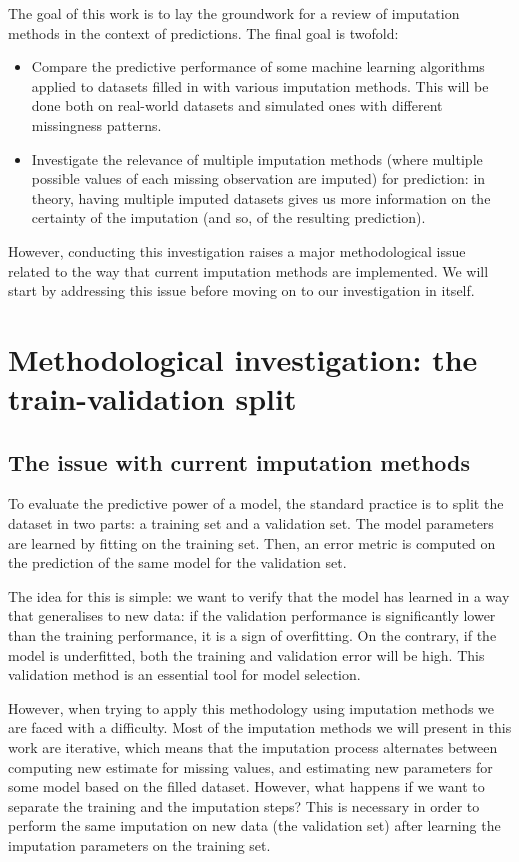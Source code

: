 \documentclass[12pt, a4paper]{article}
\begin{document}
The goal of this work is to lay the groundwork for a review of imputation methods in the context of predictions. The final goal is twofold:
\begin{itemize}
\item Compare the predictive performance of some machine learning algorithms applied to datasets filled in with various imputation methods. This will be done both on real-world datasets and simulated ones with different missingness patterns.
\item Investigate the relevance of multiple imputation methods (where multiple possible values of each missing observation are imputed) for prediction: in theory, having multiple imputed datasets gives us more information on the certainty of the imputation (and so, of the resulting prediction).
\end{itemize}

However, conducting this investigation raises a major methodological issue related to the way that current imputation methods are implemented. We will start by addressing this issue before moving on to our investigation in itself. 

\section{Methodological investigation: the train-validation split}
\subsection{The issue with current imputation methods}
To evaluate the predictive power of a model, the standard practice is to split the dataset in two parts: a training set and a validation set. The model parameters are learned by fitting on the training set. Then, an error metric is computed on the prediction of the same model for the validation set.

The idea for this is simple: we want to verify that the model has learned in a way that generalises to new data: if the validation performance is significantly lower than the training performance, it is a sign of overfitting. On the contrary, if the model is underfitted, both the training and validation error will be high. This validation method is an essential tool for model selection.

However, when trying to apply this methodology using imputation methods we are faced with a difficulty. Most of the imputation methods we will present in this work are iterative, which means that the imputation process alternates between computing new estimate for missing values, and estimating new parameters for some model based on the filled dataset. However, what happens if we want to separate the training and the imputation steps? This is necessary in order to perform the same imputation on new data (the validation set) after learning the imputation parameters on the training set.
\end{document}
